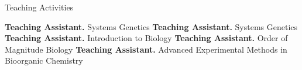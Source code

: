 \begin{rubric}{Teaching Activities}

\entry*[2017--2018]%
	\textbf{Teaching Assistant.} Systems Genetics
\entry*[2016]
	\textbf{Teaching Assistant.} Systems Genetics
\entry*[2015]
	\textbf{Teaching Assistant.} Introduction to Biology
\entry*[2014]
	\textbf{Teaching Assistant.} Order of Magnitude Biology
\entry*[2013]
	\textbf{Teaching Assistant.} Advanced Experimental Methods in Bioorganic
	Chemistry
%
\end{rubric}

